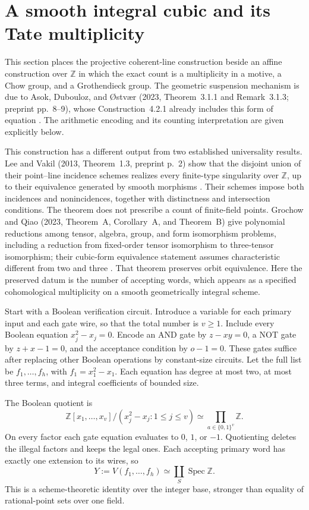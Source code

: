 \section{A smooth integral cubic and its Tate multiplicity}
\label{sec:cubic}
This section places the projective coherent-line construction beside an affine construction over $\mathbb Z$ in which the exact count is a multiplicity in a motive, a Chow group, and a Grothendieck group. The geometric suspension mechanism is due to Asok, Dubouloz, and \O stv\ae r (2023, Theorem~3.1.1 and Remark~3.1.3; preprint pp.~8--9), whose Construction~4.2.1 already includes this form of equation \cite{ff-asok}. The arithmetic encoding and its counting interpretation are given explicitly below.

This construction has a different output from two established universality results. Lee and Vakil (2013, Theorem~1.3, preprint p.~2) show that the disjoint union of their point--line incidence schemes realizes every finite-type singularity over $\mathbb Z$, up to their equivalence generated by smooth morphisms \cite{ff-lee-vakil}. Their schemes impose both incidences and nonincidences, together with distinctness and intersection conditions. The theorem does not prescribe a count of finite-field points. Grochow and Qiao (2023, Theorem~A, Corollary~A, and Theorem~B) give polynomial reductions among tensor, algebra, group, and form isomorphism problems, including a reduction from fixed-order tensor isomorphism to three-tensor isomorphism; their cubic-form equivalence statement assumes characteristic different from two and three \cite{ff-grochow-qiao}. That theorem preserves orbit equivalence. Here the preserved datum is the number of accepting words, which appears as a specified cohomological multiplicity on a smooth geometrically integral scheme.

Start with a Boolean verification circuit. Introduce a variable for each primary input and each gate wire, so that the total number is $v\geq1$. Include every Boolean equation $x_j^2-x_j=0$. Encode an AND gate by $z-xy=0$, a NOT gate by $z+x-1=0$, and the acceptance condition by $o-1=0$. These gates suffice after replacing other Boolean operations by constant-size circuits. Let the full list be $f_1,\ldots,f_h$, with $f_1=x_1^2-x_1$. Each equation has degree at most two, at most three terms, and integral coefficients of bounded size.

The Boolean quotient is
\[
 \mathbb Z[x_1,\ldots,x_v]/(x_j^2-x_j:1\leq j\leq v)
      \simeq \prod_{a\in\{0,1\}^v}\mathbb Z.
\]
On every factor each gate equation evaluates to $0$, $1$, or $-1$. Quotienting deletes the illegal factors and keeps the legal ones. Each accepting primary word has exactly one extension to its wires, so
\[
 Y:=V(f_1,\ldots,f_h)\simeq\coprod_{S}\operatorname{Spec}\mathbb Z.
\]
This is a scheme-theoretic identity over the integer base, stronger than equality of rational-point sets over one field.

